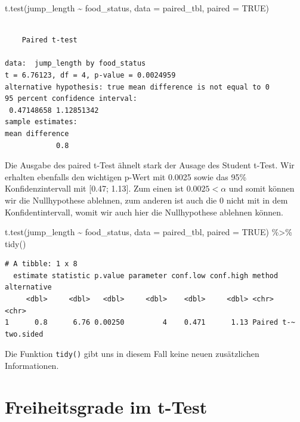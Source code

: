 \documentclass[
  letterpaper,
]{scrbook}
\newenvironment{Shaded}{\begin{snugshade}}{\end{snugshade}}
\newcommand{\AttributeTok}[1]{\textcolor[rgb]{0.40,0.45,0.13}{#1}}
\newcommand{\ConstantTok}[1]{\textcolor[rgb]{0.56,0.35,0.01}{#1}}
\newcommand{\FunctionTok}[1]{\textcolor[rgb]{0.28,0.35,0.67}{#1}}
\newcommand{\NormalTok}[1]{\textcolor[rgb]{0.00,0.23,0.31}{#1}}
\newcommand{\SpecialCharTok}[1]{\textcolor[rgb]{0.37,0.37,0.37}{#1}}
\begin{document}
\begin{Shaded}
\begin{Highlighting}[]
\FunctionTok{t.test}\NormalTok{(jump\_length }\SpecialCharTok{\textasciitilde{}}\NormalTok{ food\_status, }
       \AttributeTok{data =}\NormalTok{ paired\_tbl, }\AttributeTok{paired =} \ConstantTok{TRUE}\NormalTok{)}
\end{Highlighting}
\end{Shaded}

\begin{verbatim}

    Paired t-test

data:  jump_length by food_status
t = 6.76123, df = 4, p-value = 0.0024959
alternative hypothesis: true mean difference is not equal to 0
95 percent confidence interval:
 0.47148658 1.12851342
sample estimates:
mean difference 
            0.8 
\end{verbatim}

Die Ausgabe des paired t-Test ähnelt stark der Ausage des Student
t-Test. Wir erhalten ebenfalls den wichtigen p-Wert mit 0.0025 sowie das
95\% Konfidenzintervall mit {[}0.47; 1.13{]}. Zum einen ist
\(0.0025 < \alpha\) und somit können wir die Nullhypothese ablehnen, zum
anderen ist auch die 0 nicht mit in dem Konfidentintervall, womit wir
auch hier die Nullhypothese ablehnen können.

\begin{Shaded}
\begin{Highlighting}[]
\FunctionTok{t.test}\NormalTok{(jump\_length }\SpecialCharTok{\textasciitilde{}}\NormalTok{ food\_status, }
       \AttributeTok{data =}\NormalTok{ paired\_tbl, }\AttributeTok{paired =} \ConstantTok{TRUE}\NormalTok{) }\SpecialCharTok{\%\textgreater{}\%} 
  \FunctionTok{tidy}\NormalTok{() }
\end{Highlighting}
\end{Shaded}

\begin{verbatim}
# A tibble: 1 x 8
  estimate statistic p.value parameter conf.low conf.high method     alternative
     <dbl>     <dbl>   <dbl>     <dbl>    <dbl>     <dbl> <chr>      <chr>      
1      0.8      6.76 0.00250         4    0.471      1.13 Paired t-~ two.sided  
\end{verbatim}

Die Funktion \texttt{tidy()} gibt uns in diesem Fall keine neuen
zusätzlichen Informationen.

\hypertarget{freiheitsgrade-im-t-test}{%
\section{Freiheitsgrade im t-Test}\label{freiheitsgrade-im-t-test}}
\end{document}
